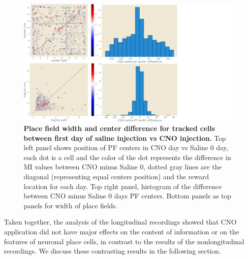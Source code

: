 \begin{figure}
    \centering
    \includegraphics[trim={0 0 250 0},clip,width=\textwidth]{Figures/Chapter4/width_center_tracked_cells_longitudinal.pdf}
    \caption[Place field width and center difference for tracked cells between first day of saline injection vs CNO injection]{\textbf{Place field width and center difference for tracked cells between first day of saline injection vs CNO injection.} Top left panel shows position of PF centers in CNO day vs Saline 0 day, each dot is a cell and the color of the dot represents the difference in MI values between CNO minus Saline 0, dotted gray lines are the diagonal (representing equal centers position) and the reward location for each day. Top right panel, histogram of the difference between CNO minus Saline 0 days PF centers. Bottom panels as top panels for width of place fields.}
    \label{fig:chap4:width_center_tracked_cells_longitudinal}
\end{figure}

Taken together, the analysis of the longitudinal recordings showed that CNO application did not have major effects on the content of information or on the features of neuronal place cells, in contrast to the results of the nonlongitudinal recordings.
We discuss these contrasting results in the following section.